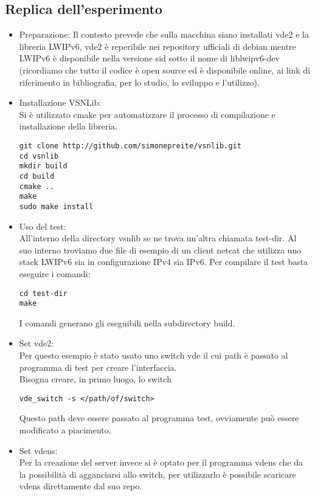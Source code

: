 \subsection{Replica dell'esperimento}
\begin{itemize}
  \item Preparazione: Il contesto prevede che sulla macchina siano installati vde2 e la libreria LWIPv6, vde2 \`e reperibile nei repository ufficiali di debian mentre LWIPv6 \`e disponibile nella versione sid sotto il nome di liblwipv6-dev (ricordiamo che tutto il codice \`e open source ed \`e disponibile online, ai link di riferimento in bibliografia, per lo studio, lo sviluppo e l'utilizzo).\\
  \item Installazione VSNLib:\\
  Si \`e utilizzato cmake per automatizzare il processo di compilazione e installazione della libreria.
  \begin{lstlisting}[language=Bashn]
git clone http://github.com/simonepreite/vsnlib.git
cd vsnlib
mkdir build
cd build
cmake ..
make
sudo make install
\end{lstlisting}
  \item Uso del test:\\
  All'interno della directory vsnlib se ne trova un'altra chiamata test-dir. Al suo interno troviamo due file di esempio di un client netcat che utilizza uno stack LWIPv6 sia in configurazione IPv4 sia IPv6. Per compilare il test basta eseguire i comandi:
  \begin{lstlisting}[language=Bashn]
cd test-dir
make
\end{lstlisting}
  I comandi generano gli eseguibili nella subdirectory build.
  \item Set vde2:\\
  Per questo esempio \`e stato usato uno switch vde il cui path \`e passato al programma di test per creare l'interfaccia.\\
  Bisogna creare, in primo luogo, lo switch
  \begin{lstlisting}[language=Bashn]
vde_switch -s </path/of/switch>
\end{lstlisting}
  Questo path deve essere passato al programma test, ovviamente pu\`o essere modificato a piacimento.\\
\item Set vdens:\\
  Per la creazione del server invece si \`e optato per il programma vdens che da la possibilit\`a di agganciarsi allo switch, per utilizzarlo \`e possibile scaricare vdens direttamente dal suo repo\cite{K16}.\\

\end{itemize}
